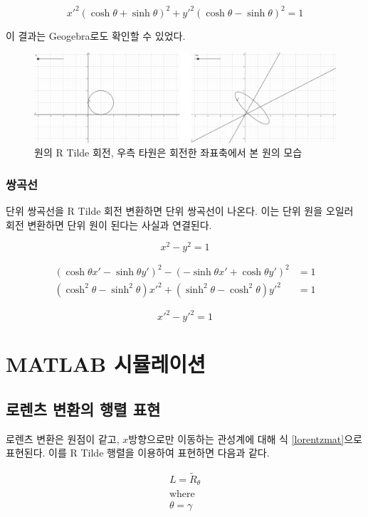 \documentclass{thesis-SJ}
\begin{document}
\[  x'^2(\cosh\theta+\sinh\theta)^2 + y'^2(\cosh\theta - \sinh\theta)^2=1\]

이 결과는 Geogebra로도 확인할 수 있었다.


\begin{figure}[h]
	\centering
	\includegraphics[width=0.7\linewidth]{images/geogebra}
	\caption{원의 R Tilde 회전, 우측 타원은 회전한 좌표축에서 본 원의 모습}
	\label{fig:geogebra}
\end{figure}

\subsubsection{쌍곡선}

단위 쌍곡선을 R Tilde 회전 변환하면 단위 쌍곡선이 나온다. 이는 단위 원을 오일러 회전 변환하면 단위 원이 된다는 사실과 연결된다.


\[  x^2-y^2=1 \]

\begin{align*}
(\cosh\theta x' -\sinh\theta y')^2 - (-\sinh\theta x' +\cosh \theta y')^2 &=1 \\
(\cosh^2\theta - \sinh^2\theta)x'^2 + (\sinh^2\theta - \cosh^2\theta)y'^2&=1
\end{align*}

\[  x'^2-y'^2=1 \]

\section{MATLAB 시뮬레이션}

\subsection{로렌츠 변환의 행렬 표현}
로렌츠 변환은 원점이 같고, $x$방향으로만 이동하는 관성계에 대해 식 \eqref{lorentzmat}으로 표현된다. 이를 R Tilde 행렬을 이용하여 표현하면 다음과 같다.

\begin{equation}
\begin{gathered}
L = \tilde{R}_\theta\\
\text{where} \\
\theta = \gamma
\end{gathered}
\end{equation}
\end{document}
